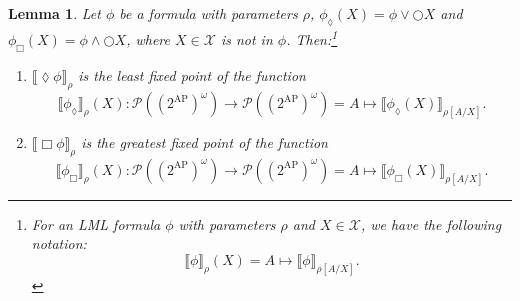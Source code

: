 \documentclass{tufte-handout} %
\newtheorem{lem}[thm]{Lemma}
\theoremstyle{definition}
\theoremstyle{remark}
\newcommand{\bra}[1]{\left(#1\right)}
\newcommand{\mP}{\mathcal{P}}
\newcommand{\0}{\textsf{0}}
\newcommand{\1}{\textsf{1}}
\newcommand{\mX}{\mathcal{X}}
\newcommand{\AP}{\text{AP}}
\newcommand{\sem}[2]{\llbracket #1 \rrbracket_{#2}}
\begin{document}
\begin{lem}\label{lem-lfpgfpmod}
	Let $\phi$ be a formula with parameters $\rho$, $\phi_{\lozenge}(X)= \phi \vee \bigcirc X$ and $\phi_{\Box}(X) = \phi \wedge \bigcirc X$, where $X \in \mX$ is not in $\phi$. Then:\footnote{For an LML formula $\phi$ with parameters $\rho$ and $X \in \mX$, we have the following notation:
	\[\sem{\phi}{\rho}(X) = A \mapsto \sem{\phi}{\rho[A/X]}.\]}
	\begin{enumerate}
		\item $\sem{\lozenge\phi}{\rho}$ is the least fixed point of the function 
		\[\sem{\phi_{\lozenge}}{\rho}(X): \mP\bra{(2^{\AP})^{\omega}}\rightarrow \mP\bra{(2^{\AP})^{\omega}} = A \mapsto \sem{\phi_{\lozenge}(X)}{\rho[A/X]}.\]
		\item $\sem{\Box\phi}{\rho}$ is the greatest fixed point of the function 
		\[\sem{\phi_{\Box}}{\rho}(X): \mP\bra{(2^{\AP})^{\omega}}\rightarrow \mP\bra{(2^{\AP})^{\omega}} = A \mapsto \sem{\phi_{\Box}(X)}{\rho[A/X]}.\]
	\end{enumerate}
\end{lem}
\end{document}
